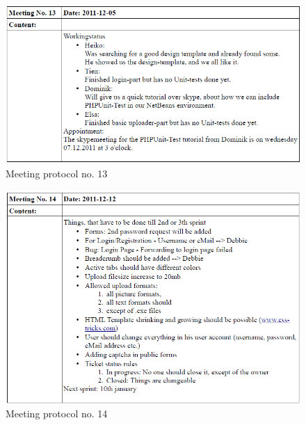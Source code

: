 \begin{appendix}
\begin{figure}
  \centering
    \includegraphics[width=\textwidth]{images/a_meetings/meeting_13.png}
  \caption{Meeting protocol no. 13}
  \label{fig:meeting protocol no. 13}
\end{figure}

\begin{figure}
  \centering
    \includegraphics[width=\textwidth]{images/a_meetings/meeting_14.png}
  \caption{Meeting protocol no. 14}
  \label{fig:meeting protocol no. 14}
\end{figure}


\end{appendix}
